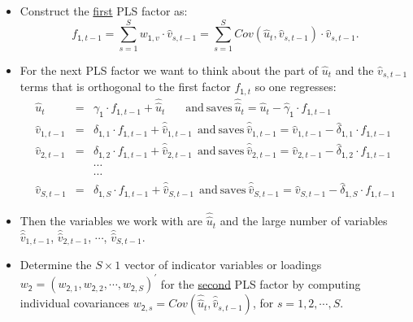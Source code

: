 \documentclass[11pt]{article}
\begin{document}
\begin{itemize}
\begin{itemize}
\begin{itemize}
\end{itemize}
\item Construct the \underline{first} PLS factor as:
\[ f_{\mathsf{1},t-1}=\sum_{s=1}^{S}w_{\mathsf{1},v}\cdot\widehat{v}_{s,t-1}=\sum_{s=1}^{S}Cov(\widehat{u}_{t},\widehat{v}_{s,t-1})\cdot\widehat{v}_{s,t-1}. \]
\item For the next PLS factor we want to think about the part of $\widehat{u}_{t}$ and the $\widehat{v}_{s,t-1}$ terms that is orthogonal to the first factor $f_{\mathsf{1},t}$ so one regresses:
\begin{eqnarray}
\widehat{u}_{t}&=&\gamma_{\mathsf{1}}\cdot f_{\mathsf{1},t-1}+\widehat{\widehat{u}}_{t} \ \ \ \ \ \ \   \ \textrm{and} \  \textrm{saves} \  
\widehat{\widehat{u}}_{t}=\widehat{u}_{t}-\widehat{\gamma}_{\mathsf{1}}\cdot f_{\mathsf{1},t-1} \nonumber \\
\widehat{v}_{1,t-1}&=&\delta_{\mathsf{1},1}\cdot f_{\mathsf{1},t-1}+\widehat{\widehat{v}}_{1,t-1} \ \ \textrm{and} \  \textrm{saves} \  
\widehat{\widehat{v}}_{1,t-1}=\widehat{v}_{1,t-1}-\widehat{\delta}_{\mathsf{1},1}\cdot f_{\mathsf{1},t-1}  \nonumber \\
\widehat{v}_{2,t-1}&=&\delta_{\mathsf{1},2}\cdot f_{\mathsf{1},t-1}+\widehat{\widehat{v}}_{2,t-1} \ \ \textrm{and} \  \textrm{saves} \  
\widehat{\widehat{v}}_{2,t-1}=\widehat{v}_{2,t-1}-\widehat{\delta}_{\mathsf{1},2}\cdot f_{\mathsf{1},t-1}  \nonumber \\
&&\cdots  \nonumber \\
&&\cdots  \nonumber \\
\widehat{v}_{S,t-1}&=&\delta_{\mathsf{1},S}\cdot f_{\mathsf{1},t-1}+\widehat{\widehat{v}}_{S,t-1} \ \ \textrm{and} \  \textrm{saves} \  
\widehat{\widehat{v}}_{S,t-1}=\widehat{v}_{S,t-1}-\widehat{\delta}_{\mathsf{1},S}\cdot f_{\mathsf{1},t-1} \nonumber 
\end{eqnarray}
\item Then the variables we work with are $\widehat{\widehat{u}}_{t}$ and the large number of variables $\widehat{\widehat{v}}_{1,t-1}$, $\widehat{\widehat{v}}_{2,t-1}$, $\cdots$, $\widehat{\widehat{v}}_{S,t-1}$.
\item Determine the $S\times1$ vector of indicator variables or loadings $w_{\mathsf{2}}=\left(w_{\mathsf{2},1}, w_{\mathsf{2},2},\cdots,w_{\mathsf{2},S}\right)^{\prime}$ for the \underline{second} PLS factor by computing individual covariances $w_{\mathsf{2},s}=Cov(\widehat{\widehat{u}}_{t},\widehat{\widehat{v}}_{s,t-1})$, for $s=1,2,\cdots,S$.
\begin{itemize}

\end{itemize}
\end{itemize}
\end{itemize}
\end{document}
